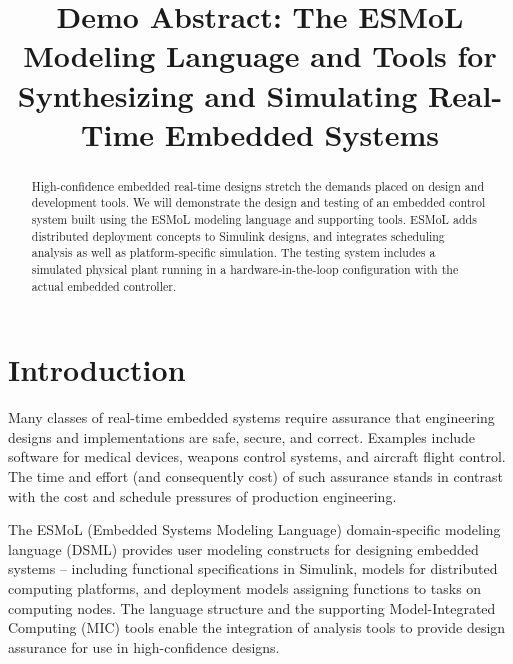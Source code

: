 %




\title{Demo Abstract: The ESMoL Modeling Language and Tools for Synthesizing and Simulating Real-Time Embedded Systems}

\author{
}

\maketitle

\begin{abstract}
High-confidence embedded real-time designs stretch the demands placed
on design and development tools.  We will demonstrate the design and
testing of an embedded control system built using the ESMoL modeling
language and supporting tools.  ESMoL adds distributed deployment 
concepts to Simulink designs, and integrates scheduling analysis as well
as platform-specific simulation.  The testing system includes a simulated
physical plant running in a hardware-in-the-loop configuration with the
actual embedded controller.
\end{abstract}

\section{Introduction}

Many classes of real-time embedded systems require assurance that 
engineering designs and implementations are safe, secure, and correct.  
Examples include software for medical devices, weapons control systems, 
and aircraft flight control.  The time and effort (and consequently cost)
of such assurance stands in contrast with the cost and schedule pressures
of production engineering.

The ESMoL (Embedded Systems Modeling Language) domain-specific modeling 
language (DSML) provides user modeling constructs for designing 
embedded systems -- including functional specifications in Simulink, 
models for distributed computing platforms, and deployment models assigning 
functions to tasks on computing nodes\cite{aces08}.  The language structure 
and the supporting Model-Integrated Computing (MIC) tools \cite{mic:metaprog} 
enable the integration of analysis tools to provide design assurance for use 
in high-confidence designs.

